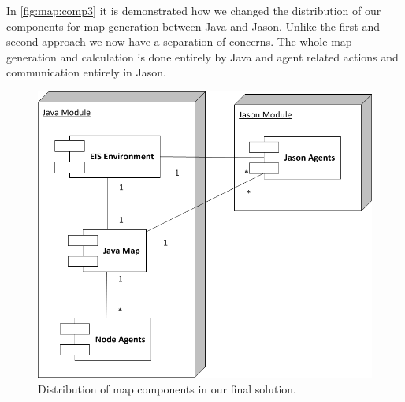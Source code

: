 In \autoref{fig:map:comp3} it is demonstrated how we changed the distribution of our components for map generation between Java and Jason. Unlike the first and second approach we now have a separation of concerns. The whole map generation and calculation is done entirely by Java and agent related actions and communication entirely in Jason.
\begin{figure}
  \centering
  \includegraphics[width=\linewidth]{images/map_comp_3.png}
  \caption{Distribution of map components in our final solution.}
  \label{fig:map:comp3}
\end{figure}